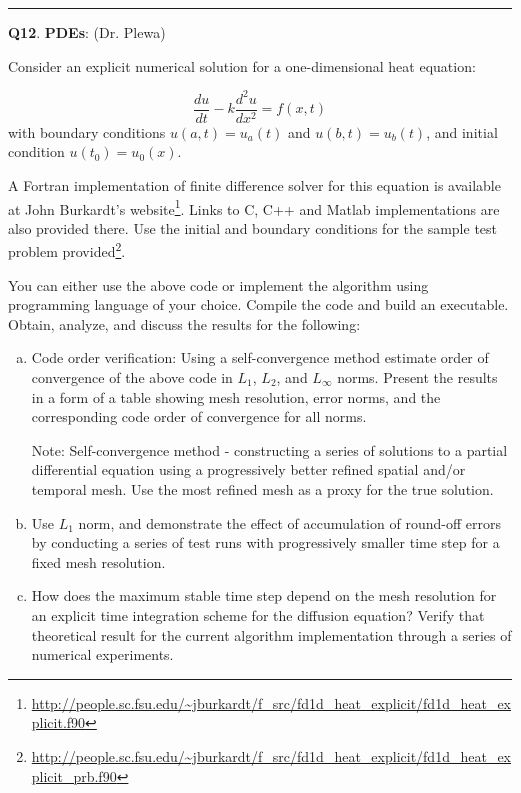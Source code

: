 \documentclass[11pt,letterpaper]{article}
\newcommand{\highlight}[1]{\textcolor{BrickRed}{#1}}
\begin{document}
\pagebreak
\hrule 
\medskip
\textbf{Q12}. \highlight{\textbf{PDEs}}: (Dr. Plewa)

\bigskip

Consider an explicit numerical solution for a one-dimensional heat equation:

$$\frac{du}{dt} - k  \frac{d^2u}{dx^2} = f(x,t)$$ with boundary conditions $u(a,t) = u_a(t)$ and $u(b,t) = u_b(t)$, and initial condition $u(t_0) = u_0(x)$.

\medskip

A Fortran implementation of finite difference solver for this equation is available at John Burkardt's website\footnote{\url{http://people.sc.fsu.edu/~jburkardt/f_src/fd1d_heat_explicit/fd1d_heat_explicit.f90}}. Links to C, C++ and Matlab implementations are also provided there. Use the initial and boundary conditions for the sample test problem provided\footnote{\url{http://people.sc.fsu.edu/~jburkardt/f_src/fd1d_heat_explicit/fd1d_heat_explicit_prb.f90}}.

\medskip

You can either use the above code or implement the algorithm using programming language of your choice. Compile the code and build an executable. Obtain, analyze, and discuss the results for the following:

\begin{enumerate}[a)]
\item Code order verification: Using a self-convergence method estimate order of convergence of the above
code in $L_1$, $L_2$, and $L_{\infty}$ norms. Present the results in a form of a table showing mesh resolution,
error norms, and the corresponding code order of convergence for all norms.

Note: Self-convergence method - constructing a series of solutions to a partial differential equation using a progressively better refined spatial and/or temporal mesh. Use the most refined mesh as a proxy for the true solution.

\item Use $L_1$ norm, and demonstrate the effect of accumulation of round-off errors by conducting a series of
test runs with progressively smaller time step for a fixed mesh resolution.

\item How does the maximum stable time step depend on the mesh resolution for an explicit time integration scheme for
the diffusion equation? Verify that theoretical result for the current algorithm implementation through a series of
numerical experiments.

\end{enumerate}

\bigskip
\medskip

\pagebreak
\end{document}
